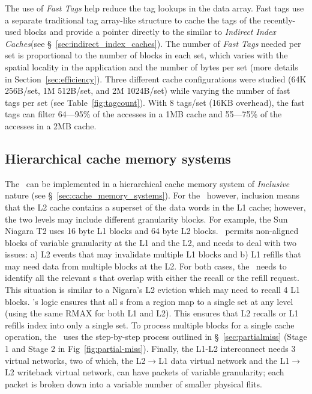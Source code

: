 The use of \textit{Fast Tags} help reduce the tag lookups in the data array. Fast tags use a separate traditional tag array-like structure to cache the tags of the recently-used blocks and provide a pointer directly to the \AB{} similar to \textit{Indirect Index Caches}(see \S~\ref{sec:indirect_index_caches}). The number of \textit{Fast Tags} needed per set is proportional to the number of blocks in each set, which varies with the spatial locality in the application and the number of bytes per set (more details in Section~\ref{sec:efficiency}). Three different cache configurations were studied (64K 256B/set, 1M 512B/set, and 2M 1024B/set) while varying the number of fast tags per set (see Table~\ref{fig:tagcount}). With 8 tags/set (16KB overhead), the fast tags can filter 64---95\% of the accesses in a 1MB cache and 55---75\% of the accesses in a 2MB cache.

\subsection{Hierarchical cache memory systems}
\label{sec:multicache}

The \AC\ can be implemented in a hierarchical cache memory system of \textit{Inclusive} nature (see \S~\ref{sec:cache_memory_systems}). For the \AC\ however, inclusion means that the L2 cache contains a superset of the data words in the L1 cache; however, the two levels may include different granularity blocks. For example, the Sun Niagara T2 uses 16 byte L1 blocks and 64 byte L2 blocks. \AC\ permits non-aligned blocks of variable granularity at the L1 and the L2, and needs to deal with two issues: a) L2 events that may invalidate multiple L1 blocks and b) L1 refills that may need data from multiple blocks at the L2. For both cases, the \AC\ needs to identify all the relevant \AB{}s that overlap with either the recall or the refill request. This situation is similar to a Nigara's L2 eviction which may need to recall 4 L1 blocks. \AC{}'s logic ensures that all \AB{}s from a region map to a single set at any level (using the same RMAX for both L1 and L2). This ensures that L2 recalls or L1 refills index into only a single set. To process multiple blocks for a single cache operation, the \AC\ uses the step-by-step process outlined in \S~\ref{sec:partialmiss} (Stage 1 and Stage 2 in Fig~\ref{fig:partial-miss}). Finally, the L1-L2 interconnect needs 3 virtual networks, two of which, the L2$\rightarrow$L1 data virtual network and the L1$\rightarrow$L2 writeback virtual network, can have packets of variable granularity; each packet is broken down into a variable number of smaller physical flits.

